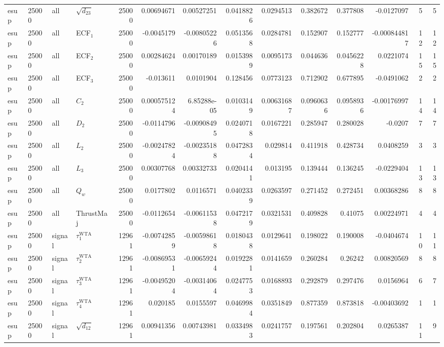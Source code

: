 \begin{landscape}
\begin{longtable}{llll r rrrr rr r rr}
esup & 25000 & all & $\sqrt{d_{23}}$ & 25000 & 0.00694671 & 0.00527251 & 0.0418826 & 0.0294513 & 0.382672 & 0.377808 & -0.0127097 & 5 & 5 \\
esup & 25000 & all & ECF$_1$ & 25000 & -0.0045179 & -0.00805226 & 0.0513568 & 0.0284781 & 0.152907 & 0.152777 & -0.000844817 & 12 & 12 \\
esup & 25000 & all & ECF$_2$ & 25000 & 0.00284624 & 0.00170189 & 0.0153989 & 0.0095173 & 0.044636 & 0.0456228 & 0.0221074 & 15 & 15 \\
esup & 25000 & all & ECF$_3$ & 25000 & -0.013611 & 0.0101904 & 0.128456 & 0.0773123 & 0.712902 & 0.677895 & -0.0491062 & 2 & 2 \\
esup & 25000 & all & $C_2$ & 25000 & 0.000575124 & 6.85288e-05 & 0.0103149 & 0.00631687 & 0.0960636 & 0.0958936 & -0.00176997 & 14 & 14 \\
esup & 25000 & all & $D_2$ & 25000 & -0.0114796 & -0.00908495 & 0.0240718 & 0.0167221 & 0.285947 & 0.280028 & -0.0207 & 7 & 7 \\
esup & 25000 & all & $L_2$ & 25000 & -0.00247824 & -0.00235188 & 0.0472834 & 0.029814 & 0.411918 & 0.428734 & 0.0408259 & 3 & 3 \\
esup & 25000 & all & $L_3$ & 25000 & 0.00307768 & 0.00332733 & 0.0204141 & 0.013195 & 0.139444 & 0.136245 & -0.0229404 & 13 & 13 \\
esup & 25000 & all & $Q_w$ & 25000 & 0.0177802 & 0.0116571 & 0.0402339 & 0.0263597 & 0.271452 & 0.272451 & 0.00368286 & 8 & 8 \\
esup & 25000 & all & ThrustMaj & 25000 & -0.0112654 & -0.00611538 & 0.0472179 & 0.0321531 & 0.409828 & 0.41075 & 0.00224971 & 4 & 4 \\
esup & 25000 & signal & $\tau_1^{\mathrm{WTA}}$ & 12961 & -0.00742859 & -0.00598618 & 0.0180438 & 0.0129641 & 0.198022 & 0.190008 & -0.0404674 & 10 & 11 \\
esup & 25000 & signal & $\tau_2^{\mathrm{WTA}}$ & 12961 & -0.00869531 & -0.00659244 & 0.0192281 & 0.0141659 & 0.260284 & 0.26242 & 0.00820569 & 8 & 8 \\
esup & 25000 & signal & $\tau_3^{\mathrm{WTA}}$ & 12961 & -0.00495204 & -0.00314064 & 0.0247753 & 0.0168893 & 0.292879 & 0.297476 & 0.0156964 & 6 & 7 \\
esup & 25000 & signal & $\tau_4^{\mathrm{WTA}}$ & 12961 & 0.020185 & 0.0155597 & 0.0469984 & 0.0351849 & 0.877359 & 0.873818 & -0.00403692 & 1 & 1 \\
esup & 25000 & signal & $\sqrt{d_{12}}$ & 12961 & 0.00941356 & 0.00743981 & 0.0334983 & 0.0241757 & 0.197561 & 0.202804 & 0.0265387 & 11 & 9 \\

\end{longtable}
\end{landscape}
